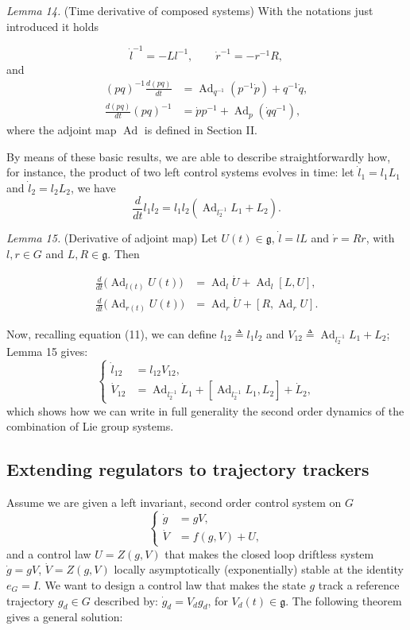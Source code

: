 \documentclass[10pt,twocolumn]{article}
\newcommand{\gfrak}{\mathfrak g}
\newcommand{\Ad}{\operatorname{Ad}}
\newcommand{\paperhead}[2]{\par\medskip\noindent\textit{#1} #2\par}
\begin{document}
\paperhead{Lemma 14.}{(Time derivative of composed systems) With the notations just introduced it holds}
\begin{equation*}
\dot l^{-1}=-Ll^{-1},\qquad \dot r^{-1}=-r^{-1}R,
\end{equation*}
and
\begin{align*}
(pq)^{-1}\frac{d(pq)}{dt}
&=\Ad_{q^{-1}}(p^{-1}\dot p)+q^{-1}\dot q,\\
\frac{d(pq)}{dt}(pq)^{-1}
&=\dot p p^{-1}+\Ad_p(\dot q q^{-1}),
\end{align*}
where the adjoint map $\Ad$ is defined in Section II.

By means of these basic results, we are able to describe straightforwardly how, for instance, the product of two left control systems evolves in time: let $\dot l_1=l_1L_1$ and $\dot l_2=l_2L_2$, we have
\begin{equation*}
\frac{d}{dt}l_1l_2=l_1l_2(\Ad_{l_2^{-1}}L_1+L_2).\tag{11}
\end{equation*}

\paperhead{Lemma 15.}{(Derivative of adjoint map) Let $U(t)\in\gfrak$, $\dot l=lL$ and $\dot r=Rr$, with $l,r\in G$ and $L,R\in\gfrak$. Then}
\begin{align*}
\frac{d}{dt}\bigl(\Ad_{l(t)}U(t)\bigr)
&=\Ad_l\dot U+\Ad_l[L,U],\\
\frac{d}{dt}\bigl(\Ad_{r(t)}U(t)\bigr)
&=\Ad_r\dot U+[R,\Ad_rU].
\end{align*}

Now, recalling equation (11), we can define $l_{12}\triangleq l_1l_2$ and $V_{12}\triangleq\Ad_{l_2^{-1}}L_1+L_2$; Lemma 15 gives:
\begin{equation*}
\left\{\begin{aligned}
\dot l_{12}&=l_{12}V_{12},\\
\dot V_{12}&=\Ad_{l_2^{-1}}\dot L_1+[\Ad_{l_2^{-1}}L_1,L_2]+\dot L_2,
\end{aligned}\right.
\end{equation*}
which shows how we can write in full generality the second order dynamics of the combination of Lie group systems.

\subsection{Extending regulators to trajectory trackers}
Assume we are given a left invariant, second order control system on $G$
\begin{equation*}
\left\{\begin{aligned}
\dot g&=gV,\\
\dot V&=f(g,V)+U,
\end{aligned}\right.\tag{12}
\end{equation*}
and a control law $U=Z(g,V)$ that makes the closed loop driftless system $\dot g=gV$, $\dot V=Z(g,V)$ locally asymptotically (exponentially) stable at the identity $e_G=I$. We want to design a control law that makes the state $g$ track a reference trajectory $g_d\in G$ described by: $\dot g_d=V_dg_d$, for $V_d(t)\in\gfrak$. The following theorem gives a general solution:
\end{document}
